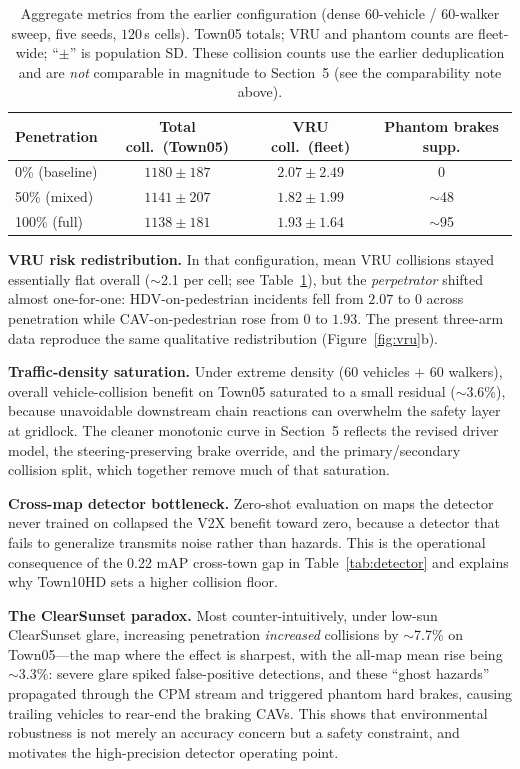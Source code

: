 \documentclass[11pt]{article}
\begin{document}
\begin{table}[t]
  \centering
  \caption{Aggregate metrics from the earlier configuration (dense 60-vehicle /
  60-walker sweep, five seeds, $120$\,s cells). Town05 totals; VRU and phantom
  counts are fleet-wide; ``$\pm$'' is population SD. These collision counts use the
  earlier deduplication and are \emph{not} comparable in magnitude to Section~5
  (see the comparability note above).}
  \label{tab:old}
  \small
  \begin{tabular}{lccc}
    \toprule
    Penetration & Total coll.\ (Town05) & VRU coll.\ (fleet) & Phantom brakes supp. \\
    \midrule
    0\% (baseline) & $1180\pm187$ & $2.07\pm2.49$ & 0 \\
    50\% (mixed)   & $1141\pm207$ & $1.82\pm1.99$ & $\sim$48 \\
    100\% (full)   & $1138\pm181$ & $1.93\pm1.64$ & $\sim$95 \\
    \bottomrule
  \end{tabular}
\end{table}

\noindent\textbf{VRU risk redistribution.} In that configuration, mean VRU
collisions stayed essentially flat overall ($\sim$2.1 per cell; see
Table~\ref{tab:old}), but the \emph{perpetrator} shifted almost one-for-one:
HDV-on-pedestrian incidents fell from $2.07$ to $0$ across penetration while
CAV-on-pedestrian rose from $0$ to $1.93$. The present three-arm data
reproduce the same qualitative redistribution (Figure~\ref{fig:vru}b).

\noindent\textbf{Traffic-density saturation.} Under extreme density (60 vehicles
$+$ 60 walkers), overall vehicle-collision benefit on Town05 saturated to a small
residual ($\sim$3.6\%), because unavoidable downstream chain reactions can overwhelm
the safety layer at gridlock. The cleaner monotonic curve in Section~5 reflects the
revised driver model, the steering-preserving brake override, and the
primary/secondary collision split, which together remove much of that saturation.

\noindent\textbf{Cross-map detector bottleneck.} Zero-shot evaluation on maps the
detector never trained on collapsed the V2X benefit toward zero, because a detector
that fails to generalize transmits noise rather than hazards. This is the operational
consequence of the 0.22 mAP cross-town gap in Table~\ref{tab:detector} and explains
why Town10HD sets a higher collision floor.

\noindent\textbf{The ClearSunset paradox.} Most counter-intuitively, under low-sun
ClearSunset glare, increasing penetration \emph{increased} collisions by
$\sim$7.7\% on Town05---the map where the effect is sharpest, with the all-map mean
rise being $\sim$3.3\%: severe glare spiked false-positive detections, and these
``ghost hazards''
propagated through the CPM stream and triggered phantom hard brakes, causing
trailing vehicles to rear-end the braking CAVs. This shows that environmental
robustness is not merely an accuracy concern but a safety constraint, and motivates
the high-precision detector operating point.
\end{document}
